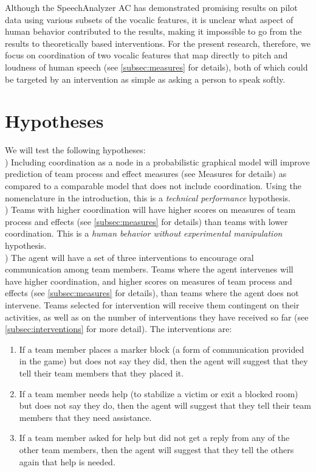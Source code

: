 Although the SpeechAnalyzer AC has demonstrated promising results on pilot data
using various subsets of the vocalic features, it is unclear what aspect of
human behavior contributed to the results, making it impossible to go from the
results to theoretically based interventions. For the present research,
therefore, we focus on coordination of two vocalic features that map directly
to pitch and loudness of human speech (see \autoref{subsec:measures} for
details), both of which could be targeted by an intervention as simple as
asking a person to speak softly. 

\section{Hypotheses}

We will test the following hypotheses:\\

) Including coordination as a node in a probabilistic graphical
model will improve prediction of team process and effect measures (see Measures
for details)  as compared to a comparable model that does not include
coordination. Using the nomenclature in the introduction, this is a
\textit{technical performance} hypothesis.\\

) Teams with higher coordination will have higher scores on measures
of team process and effects (see \autoref{subsec:measures} for details) than
teams with lower coordination. This is a
\textit{human behavior without experimental manipulation} hypothesis. \\

) The agent will have a set of three interventions to encourage oral
communication among team members. Teams where the agent intervenes will have
higher coordination, and higher scores on measures of team process and effects
(see \autoref{subsec:measures} for details), than teams where the agent does
not intervene.  Teams selected for intervention will receive them contingent on
their activities, as well as on the number of interventions they have received
so far (see \autoref{subsec:interventions} for more detail).  The interventions
are:

\begin{enumerate}
    \item If a team member places a marker block (a form of communication
        provided in the game) but does not say they did, then the agent
        will suggest that they tell their team members that they placed it. 

    \item If a team member needs help (to stabilize a
        victim or exit a blocked room) but does not say they do, then the
        agent will suggest that they tell their team members that they need
        assistance. 

    \item If a team member asked for help but did not get a
        reply from any of the other team members, then the agent will
        suggest that they tell the others again that help is needed. 
\end{enumerate}

